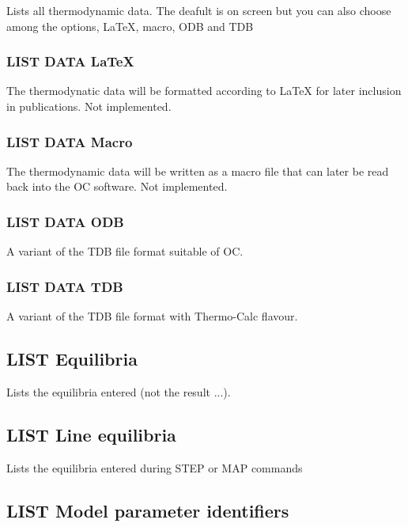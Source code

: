 \documentclass[12pt]{article}
\begin{document}
Lists all thermodynamic data.  The deafult is on screen but you can also
choose among the options, LaTeX, macro, ODB and TDB

\subsubsection{LIST DATA LaTeX}

The thermodynatic data will be formatted according to LaTeX for later
inclusion in publications.  Not implemented.

\subsubsection{LIST DATA Macro}

The thermodynamic data will be written as a macro file that can later
be read back into the OC software.  Not implemented.

\subsubsection{LIST DATA ODB}

A variant of the TDB file format suitable of OC.

\subsubsection{LIST DATA TDB}

A variant of the TDB file format with Thermo-Calc flavour.

\subsection{LIST Equilibria}

Lists the equilibria entered (not the result ...).

\subsection{LIST Line equilibria}

Lists the equilibria entered during STEP or MAP commands

\subsection{LIST Model parameter identifiers}
\end{document}
